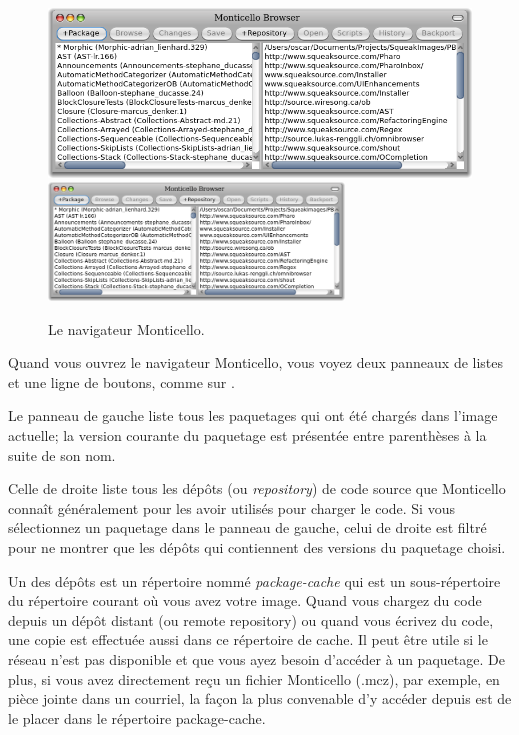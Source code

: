 \documentclass[a4paper,10pt,twoside]{book}
\begin{document}
\begin{figure}[btp]
	\begin{center}
	\ifluluelse
		{\includegraphics[width=\textwidth]{freshMonticello}}
		{\includegraphics[width=0.7\textwidth]{freshMonticello}}
	\end{center}
	\caption{Le navigateur Monticello.}
\end{figure}

Quand vous ouvrez le navigateur Monticello, vous voyez deux panneaux
de listes et une ligne de boutons, comme sur .

Le panneau de gauche liste tous les paquetages qui ont été chargés
dans l'image actuelle; la version courante du paquetage est
présentée entre parenthèses à la suite de son nom.

Celle de droite liste tous les dépôts (ou \emph{repository}) de code
source que Monticello connaît généralement pour les avoir utilisés
pour charger le code. Si vous sélectionnez un paquetage dans le panneau de 
gauche, celui de droite est filtré pour ne montrer que les dépôts
qui contiennent des versions du paquetage choisi.

Un des dépôts est un répertoire nommé \emph{package-cache} qui
est un sous-répertoire du répertoire courant où vous avez
votre image.
Quand vous chargez du code depuis un dépôt distant (ou remote repository)
ou quand vous écrivez du code, une copie est effectuée aussi dans ce
répertoire de cache. Il peut être utile si le réseau n'est pas 
disponible et que vous ayez besoin d'accéder à un paquetage. De plus,
si vous avez directement reçu un fichier Monticello (.mcz), par exemple, 
en pièce jointe dans un courriel, la façon la plus convenable d'y accéder
depuis \pharo est de le placer dans le répertoire package-cache.
\end{document}
